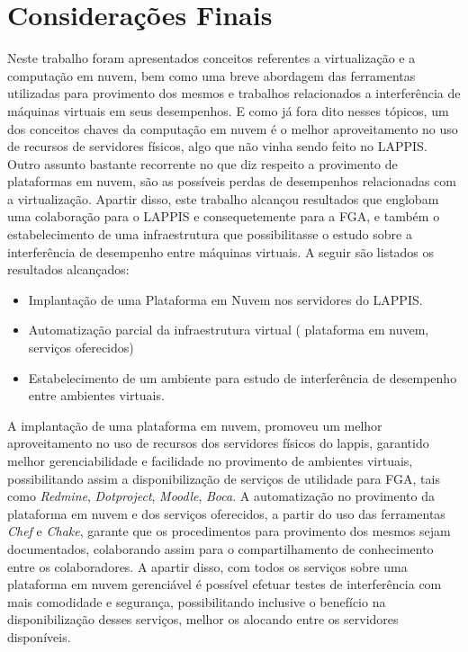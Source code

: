 \chapter{Considerações Finais}
\label{cap:consideracoes_finais}


Neste trabalho foram apresentados conceitos referentes a virtualização e a computação em nuvem, bem como uma breve abordagem das ferramentas utilizadas para provimento dos mesmos e trabalhos relacionados a interferência de máquinas virtuais em seus desempenhos. E como já fora dito nesses tópicos, um dos conceitos chaves da computação em nuvem é o melhor aproveitamento no uso de recursos de servidores físicos, algo que não vinha sendo feito no LAPPIS. Outro assunto bastante recorrente no que diz respeito a provimento de plataformas em nuvem, são as possíveis perdas de desempenhos relacionadas com a virtualização. Apartir disso, este trabalho alcançou resultados que englobam uma colaboração para o LAPPIS e consequetemente para a FGA, e também o estabelecimento de uma infraestrutura que possibilitasse o estudo sobre a interferência de desempenho entre máquinas virtuais. A seguir são listados os resultados alcançados:  

\begin{itemize}
  \item Implantação de uma Plataforma em Nuvem nos servidores do LAPPIS.
  \item Automatização parcial da infraestrutura virtual ( plataforma em nuvem, serviços oferecidos)
  \item Estabelecimento de um ambiente para estudo de interferência de desempenho entre ambientes virtuais.
\end{itemize}

A implantação de uma plataforma em nuvem, promoveu um melhor aproveitamento no uso de recursos dos servidores físicos do lappis, garantido melhor gerenciabilidade e facilidade no provimento de ambientes virtuais, possibilitando assim a disponibilização de serviços de utilidade para FGA, tais como \textit{Redmine}, \textit{Dotproject}, \textit{Moodle}, \textit{Boca}. A automatização no provimento da plataforma em nuvem e dos serviços oferecidos, a partir do uso das ferramentas \textit{Chef} e \textit{Chake}, garante que os procedimentos para provimento dos mesmos sejam documentados, colaborando assim para o compartilhamento de conhecimento entre os colaboradores. A apartir disso, com todos os serviços sobre uma plataforma em nuvem gerenciável é possível efetuar testes de interferência com mais comodidade e segurança, possibilitando inclusive o benefício na disponibilização desses serviços, melhor os alocando entre os servidores disponíveis.

